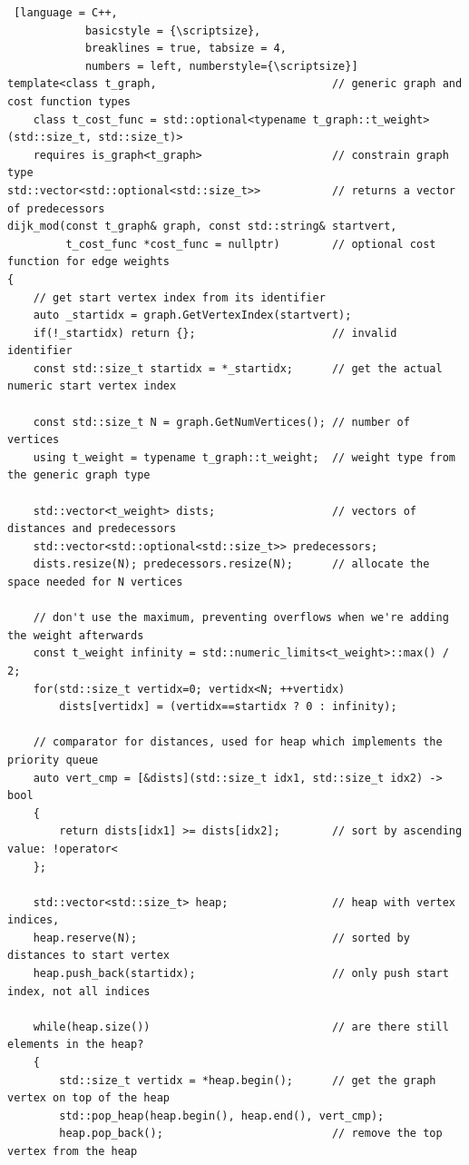 \begin{listing}[htb]
	\begin{lstlisting} [language = C++,
			basicstyle = {\scriptsize},
			breaklines = true, tabsize = 4,
			numbers = left, numberstyle={\scriptsize}]
template<class t_graph,                           // generic graph and cost function types
	class t_cost_func = std::optional<typename t_graph::t_weight>(std::size_t, std::size_t)>
	requires is_graph<t_graph>                    // constrain graph type
std::vector<std::optional<std::size_t>>           // returns a vector of predecessors
dijk_mod(const t_graph& graph, const std::string& startvert,
         t_cost_func *cost_func = nullptr)        // optional cost function for edge weights
{
	// get start vertex index from its identifier
	auto _startidx = graph.GetVertexIndex(startvert);
	if(!_startidx) return {};                     // invalid identifier
	const std::size_t startidx = *_startidx;      // get the actual numeric start vertex index

	const std::size_t N = graph.GetNumVertices(); // number of vertices
	using t_weight = typename t_graph::t_weight;  // weight type from the generic graph type

	std::vector<t_weight> dists;                  // vectors of distances and predecessors
	std::vector<std::optional<std::size_t>> predecessors;
	dists.resize(N); predecessors.resize(N);      // allocate the space needed for N vertices

	// don't use the maximum, preventing overflows when we're adding the weight afterwards
	const t_weight infinity = std::numeric_limits<t_weight>::max() / 2;
	for(std::size_t vertidx=0; vertidx<N; ++vertidx)
		dists[vertidx] = (vertidx==startidx ? 0 : infinity);

	// comparator for distances, used for heap which implements the priority queue
	auto vert_cmp = [&dists](std::size_t idx1, std::size_t idx2) -> bool
	{
		return dists[idx1] >= dists[idx2];        // sort by ascending value: !operator<
	};

	std::vector<std::size_t> heap;                // heap with vertex indices,
	heap.reserve(N);                              // sorted by distances to start vertex
	heap.push_back(startidx);                     // only push start index, not all indices

	while(heap.size())                            // are there still elements in the heap?
	{
		std::size_t vertidx = *heap.begin();      // get the graph vertex on top of the heap
		std::pop_heap(heap.begin(), heap.end(), vert_cmp);
		heap.pop_back();                          // remove the top vertex from the heap


\end{lstlisting}
\end{listing}
